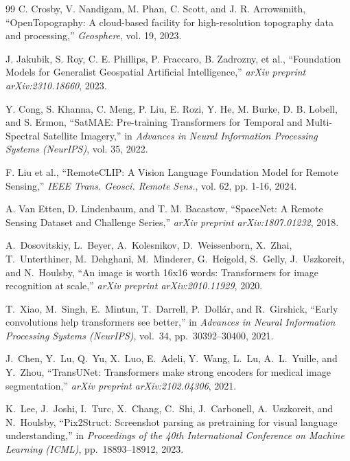 \documentclass{book}
\begin{document}
\begin{thebibliography}{99}
C. Crosby, V. Nandigam, M. Phan, C. Scott, and J. R. Arrowsmith, 
\newblock ``OpenTopography: A cloud-based facility for high-resolution topography data and processing,'' 
\newblock \emph{Geosphere}, vol. 19, 2023.

J. Jakubik, S. Roy, C. E. Phillips, P. Fraccaro, B. Zadrozny, et al., 
\newblock ``Foundation Models for Generalist Geospatial Artificial Intelligence,'' 
\newblock \emph{arXiv preprint arXiv:2310.18660}, 2023.

Y. Cong, S. Khanna, C. Meng, P. Liu, E. Rozi, Y. He, M. Burke, D. B. Lobell, and S. Ermon, 
\newblock ``SatMAE: Pre-training Transformers for Temporal and Multi-Spectral Satellite Imagery,'' 
\newblock in \emph{Advances in Neural Information Processing Systems (NeurIPS)}, vol. 35, 2022.

F. Liu et al., ``RemoteCLIP: A Vision Language Foundation Model for Remote Sensing,'' \emph{IEEE Trans. Geosci. Remote Sens.}, vol. 62, pp. 1-16, 2024.

A. Van Etten, D. Lindenbaum, and T. M. Bacastow, 
\newblock ``SpaceNet: A Remote Sensing Dataset and Challenge Series,'' 
\newblock \emph{arXiv preprint arXiv:1807.01232}, 2018.

A.~Dosovitskiy, L.~Beyer, A.~Kolesnikov, D.~Weissenborn, X.~Zhai,
T.~Unterthiner, M.~Dehghani, M.~Minderer, G.~Heigold, S.~Gelly, J.~Uszkoreit,
and N.~Houlsby,
``An image is worth 16x16 words: Transformers for image recognition at scale,''
\textit{arXiv preprint arXiv:2010.11929}, 2020.

T.~Xiao, M.~Singh, E.~Mintun, T.~Darrell, P.~Doll{\'a}r, and R.~Girshick,
``Early convolutions help transformers see better,''
in \textit{Advances in Neural Information Processing Systems (NeurIPS)},
vol.~34, pp.~30392--30400, 2021.

J.~Chen, Y.~Lu, Q.~Yu, X.~Luo, E.~Adeli, Y.~Wang, L.~Lu, A.~L.~Yuille,
and Y.~Zhou,
``{TransUNet}: Transformers make strong encoders for medical image
segmentation,''
\textit{arXiv preprint arXiv:2102.04306}, 2021.

K.~Lee, J.~Joshi, I.~Turc, X.~Chang, C.~Shi, J.~Carbonell, A.~Uszkoreit,
and N.~Houlsby,
``{Pix2Struct}: Screenshot parsing as pretraining for visual language
understanding,''
in \textit{Proceedings of the 40th International Conference on Machine
Learning (ICML)}, pp.~18893--18912, 2023.


\end{thebibliography}
\end{document}

